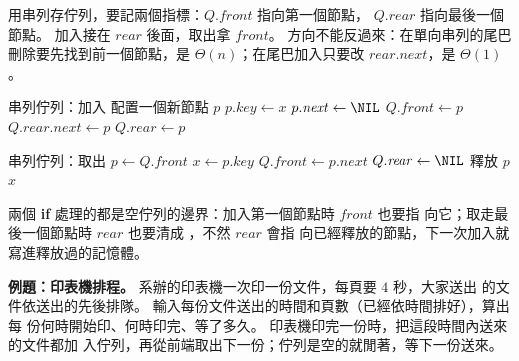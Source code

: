用串列存佇列，要記兩個指標：$Q.\mathit{front}$ 指向第一個節點，
$Q.\mathit{rear}$ 指向最後一個節點。 加入接在 $\mathit{rear}$ 後面，取出拿
$\mathit{front}$。 方向不能反過來：在單向串列的尾巴刪除要先找到前一個節點，是
$\Theta(n)$；在尾巴加入只要改 $\mathit{rear}.\mathit{next}$，是 $\Theta(1)$。

\begin{pseudo}[label=alg:sq-list-queue]{串列佇列：加入}
    \State 配置一個新節點 $p$
    \State $p.\mathit{key} \gets x$
    \State $p.\mathit{next} \gets \NIL$
     
        \State $Q.\mathit{front} \gets p$
    \Else
        \State $Q.\mathit{rear}.\mathit{next} \gets p$
    \EndIf
    \State $Q.\mathit{rear} \gets p$
\EndProcedure
\end{pseudo}

\begin{pseudo}[label=alg:sq-list-dequeue, unbreakable]{串列佇列：取出}
        \State {}
    \EndIf
    \State $p \gets Q.\mathit{front}$
    \State $x \gets p.\mathit{key}$
    \State $Q.\mathit{front} \gets p.\mathit{next}$
     
        \State $Q.\mathit{rear} \gets \NIL$
    \EndIf
    \State 釋放 $p$
    \State \Return $x$
\EndFunction
\end{pseudo}

兩個 \textbf{if} 處理的都是空佇列的邊界：加入第一個節點時 $\mathit{front}$ 也要指
向它；取走最後一個節點時 $\mathit{rear}$ 也要清成 \NIL，不然 $\mathit{rear}$ 會指
向已經釋放的節點，下一次加入就寫進釋放過的記憶體。

\textbf{例題：印表機排程。} 系辦的印表機一次印一份文件，每頁要 $4$ 秒，大家送出
的文件依送出的先後排隊。 輸入每份文件送出的時間和頁數（已經依時間排好），算出每
份何時開始印、何時印完、等了多久。 印表機印完一份時，把這段時間內送來的文件都加
入佇列，再從前端取出下一份；佇列是空的就閒著，等下一份送來。

